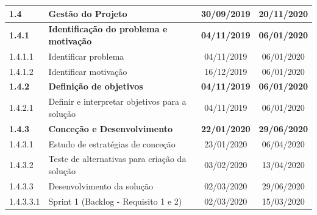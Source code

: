 \begin{table}[H]
\begin{center}
\begin{tabular}{| l | m{8.5cm} | c | c |}
                \textbf{1.4} & \quad \textbf{Gestão do Projeto} & \textbf{30/09/2019} & \textbf{20/11/2020} \\ \hline
                \textbf{1.4.1} & \quad\quad \textbf{Identificação do problema e motivação} & \textbf{04/11/2019} & \textbf{06/01/2020} \\ \hline
                1.4.1.1 & \quad\quad\quad Identificar problema & 04/11/2019 & 06/01/2020 \\ \hline
                1.4.1.2 & \quad\quad\quad Identificar motivação & 16/12/2019 & 06/01/2020 \\ \hline
                \textbf{1.4.2} & \quad\quad \textbf{Definição de objetivos} & \textbf{04/11/2019} & \textbf{06/01/2020} \\ \hline
                1.4.2.1 & \quad\quad\quad Definir e interpretar objetivos para a solução & 04/11/2019 & 06/01/2020 \\ \hline
                \textbf{1.4.3} & \quad\quad \textbf{Conceção e Desenvolvimento} & \textbf{22/01/2020} & \textbf{29/06/2020} \\ \hline
                1.4.3.1 & \quad\quad\quad Estudo de estratégias de conceção & 23/01/2020 & 06/04/2020 \\ \hline
                1.4.3.2 & \quad\quad\quad Teste de alternativas para criação da solução & 03/02/2020 & 13/04/2020 \\ \hline
                1.4.3.3 & \quad\quad\quad Desenvolvimento da solução & 02/03/2020 & 29/06/2020 \\ \hline
                1.4.3.3.1 & \quad\quad\quad\quad Sprint 1 (Backlog - Requisito 1 e 2) & 02/03/2020 & 15/03/2020 \\ \hline

\end{tabular}
\end{center}
\end{table}
